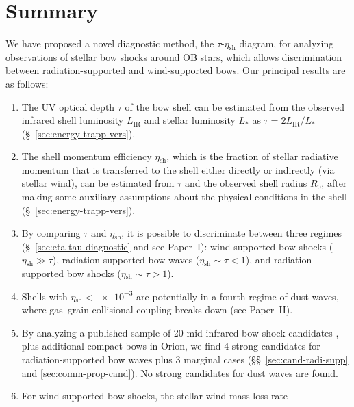 \documentclass[useAMS, usenatbib, a4paper]{mnras}
\newcommand\IR{\ensuremath{_{\text{IR}}}}
\newcommand\shell{\ensuremath{_{\text{sh}}}}
\begin{document}





\section{Summary}
\label{sec:conclusions}

We have proposed a novel diagnostic method, the \(\tau\)-\(\eta\shell\)
diagram, for analyzing observations of stellar bow shocks around OB
stars, which allows discrimination between radiation-supported and
wind-supported bows.  Our principal results are as follows:
\begin{enumerate}[1.]
\item The UV optical depth \(\tau\) of the bow shell can be estimated
  from the observed infrared shell luminosity \(L\IR\) and stellar
  luminosity \(L_*\) as \(\tau = 2 L\IR/L_*\)
  (\S~\ref{sec:energy-trapp-vers}).
\item The shell momentum efficiency \(\eta\shell\), which is the
  fraction of stellar radiative momentum that is transferred to the
  shell either directly or indirectly (via stellar wind), can be
  estimated from \(\tau\) and the observed shell radius \(R_0\), after
  making some auxiliary assumptions about the physical conditions in
  the shell (\S~\ref{sec:energy-trapp-vers}).
\item By comparing \(\tau\) and \(\eta\shell\), it is possible to
  discriminate between three regimes (\S~\ref{sec:eta-tau-diagnostic}
  and see Paper~I): wind-supported bow shocks
  (\(\eta\shell \gg \tau\)), radiation-supported bow waves
  (\(\eta\shell \sim \tau < 1\)), and radiation-supported bow shocks
  (\(\eta\shell \sim \tau > 1\)).
\item Shells with \(\eta\shell < \num{e-3}\) are potentially in a
  fourth regime of dust waves, where gas--grain collisional coupling
  breaks down (see Paper~II).
\item By analyzing a published sample of 20 mid-infrared bow shock
  candidates \citep[K18]{Kobulnicky:2018a}, plus additional compact
  bows in Orion, we find 4 strong candidates for radiation-supported
  bow waves plus 3 marginal cases (\S\S~\ref{sec:cand-radi-supp} and
  \ref{sec:comm-prop-cand}).  No strong candidates for dust waves are
  found.
\item For wind-supported bow shocks, the stellar wind mass-loss rate

\end{enumerate}
\end{document}
